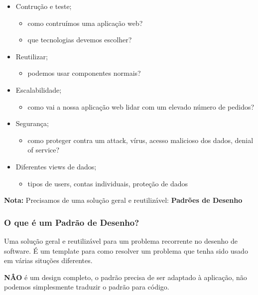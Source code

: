 \documentclass{article}
\begin{document}
\begin{flushleft}
  \begin{itemize}
    \item Contrução e teste;
    \begin{itemize}
      \item como contruímos uma aplicação web?
      \item que tecnologias devemos escolher?
    \end{itemize}

    \item Reutilizar;
    \begin{itemize}
      \item podemos usar componentes normais?
    \end{itemize}

    \item Escalabilidade;
    \begin{itemize}
      \item como vai a nossa aplicação web lidar com um elevado número de pedidos?
    \end{itemize}

    \item Segurança;
    \begin{itemize}
      \item como proteger contra um attack, vírus, acesso malicioso dos dados, denial of service?
    \end{itemize}


    \item Diferentes views de dados;
    \begin{itemize}
      \item tipos de users, contas individuais, proteção de dados
    \end{itemize}
  \end{itemize}

  \vspace{5mm}
  \textbf{Nota:} Precisamos de uma solução geral e reutilizável: \textbf{Padrões de Desenho}
\end{flushleft}

\subsubsection{O que é um Padrão de Desenho?}

\begin{flushleft}
  Uma solução geral e reutilizável para um problema recorrente no desenho de software.
  É um template para como resolver um problema que tenha sido usado em várias situções diferentes.

  \textbf{NÂO} é um design completo, o padrão precisa de ser adaptado à aplicação,
  não podemos simplesmente traduzir o padrão para código.
\end{flushleft}
\end{document}
